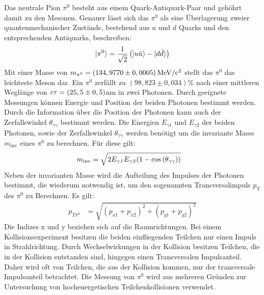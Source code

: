 Das neutrale Pion $\pi^{0}$ besteht aus einem Quark-Antiquark-Paar und geh\"ohrt damit zu den Mesonen.
Genauer l\"asst sich das $\pi^{0}$ als eine \"Uberlagerung zweier quantenmechanischer Zust\"ande, bestehend aus $u$ und $d$ Quarks und den entsprechenden Antiquarks, beschreiben:
\begin{align}
\lvert\pi^{0}\rangle = \frac{1}{\sqrt{2}}\left(\lvert u\bar{u}\rangle-\lvert d\bar{d}\rangle\right) \label{eq:pi0state}
\end{align}
Mit einer Masse von $m_{\pi^{0}} = \left(134,9770\pm0,0005\right) \rm{MeV}/c^{2}$ \cite{book:pdg} stellt das $\pi^{0}$ das leichteste Meson dar.
Ein ${\pi^{0}}$ zerf{\"a}llt zu $\left( 98,823\pm0,034\right)\%$ nach einer mittleren Wegl\"ange von ${\it c\tau} = (25,5\pm0,5)$nm \cite{book:pdg} in zwei Photonen.
Durch geeignete Messungen k\"onnen Energie und Position der beiden Photonen bestimmt werden.
Durch die Information \"uber die Position der Photonen kann auch der Zerfallswinkel $\theta_{\gamma\gamma}$ bestimmt werden.
Die Energien $E_{\gamma1}$ und $E_{\gamma2}$ der beiden Photonen, sowie der Zerfallswinkel $\theta_{\gamma\gamma}$ werden ben\"otigt um die invariante Masse $m_{\text{inv}}$ eines $\pi^{0}$ zu berechnen.
F{\"u}r diese gilt:
\begin{align}
m_{\text{inv}} &= \sqrt{2E_{\gamma\it{1}}E_{\gamma\it{2}}(1-\cos\left( \theta_{\gamma\gamma}\right) )} \label{eq_invmass}
\end{align}
\newline
Neben der invarianten Masse wird die Aufteilung des Impulses der Photonen bestimmt, die wiederum notwendig ist, um den sogenannten Transversalimpuls $p_\text{T}$ des $\pi^{0}$ zu Berechnen. Es gilt:
\begin{align}
p_{T\pi^{0}} &= \sqrt{\left(p_{x1}+p_{x2}\right)^{2} +\left(p_{y1}+p_{y2}\right)^{2}} \label{eq_pt}
\end{align}
Die Indizes x und y beziehen sich auf die Raumrichtungen.
\newline
Bei einem Kollisionsexperiment besitzen die beiden einfliegenden Teilchen nur einen Impuls in Strahlrichtung.
Durch Wechselwirkungen in der Kollision besitzen Teilchen, die in der Kollision entstanden sind, hingegen einen Transversalen Impulsanteil.
Daher wird oft von Teilchen, die aus der Kollision kommen, nur der transversale Impulsanteil betrachtet.
\newline
Die Messung von $\pi^{0}$ wird aus mehreren Gr\"unden zur Untersuchung von hochenergetischen Teilchenkollisionen verwendet.
